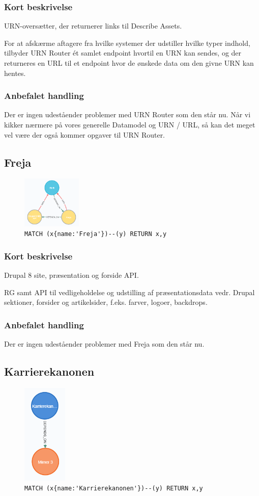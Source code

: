 \documentclass{article}
\begin{document}
\subsubsection*{Kort beskrivelse}
URN-oversætter, der returnerer links til Describe Assets.

For at afskærme aftagere fra hvilke systemer der udstiller hvilke typer indhold, tilbyder URN Router ét samlet endpoint hvortil en URN kan sendes, og der returneres en URL til et endpoint hvor de ønskede data om den givne URN kan hentes.
\subsubsection*{Anbefalet handling}
Der er ingen udeståender problemer med URN Router som den står nu. Når vi kikker nærmere på vores generelle Datamodel og URN / URL, så kan det meget vel være der også kommer opgaver til URN Router.


\subsection{Freja}
\begin{figure}[H]
\includegraphics[width=80pt]{Freja.PNG}
\cprotect\caption{\verb|MATCH (x{name:'Freja'})--(y) RETURN x,y|}
\end{figure}
\subsubsection*{Kort beskrivelse}
Drupal 8 site, præsentation og forside API.	

RG samt API til vedligeholdelse og udstilling af præsentationsdata vedr. Drupal sektioner, forsider og artikelsider, f.eks. farver, logoer, backdrops.
\subsubsection*{Anbefalet handling}
Der er ingen udeståender problemer med Freja som den står nu.


\subsection{Karrierekanonen}
\begin{figure}[H]
\includegraphics[width=60pt]{Karrierekanonen.PNG}
\cprotect\caption{\verb|MATCH (x{name:'Karrierekanonen'})--(y) RETURN x,y|}
\end{figure}
\end{document}
